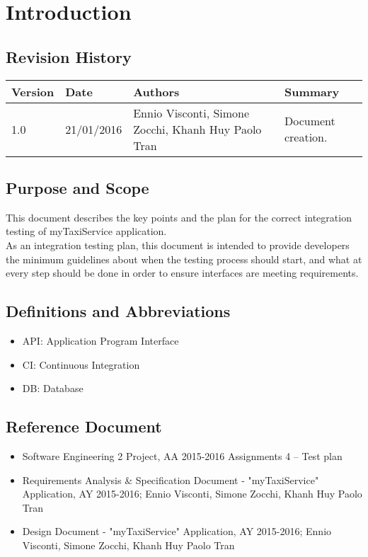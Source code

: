\section{Introduction}

\subsection{Revision History}
{\renewcommand{\arraystretch}{1.5}
\begin{tabularx}{\textwidth}{|l|l|X|l|}
    \hline 
    \textbf{Version} & \textbf{Date} & \textbf{Authors} & \textbf{Summary}\\ 
    \hline 
    
    1.0 & 21/01/2016 & Ennio Visconti, Simone Zocchi, Khanh Huy Paolo Tran & Document creation.\\
    \hline 
\end{tabularx}}

\subsection{Purpose and Scope}
This document describes the key points and the plan for the correct integration testing of myTaxiService application. \\
As an integration testing plan, this document is intended to provide developers the minimum guidelines about when the testing process should start, and what at every step should be done in order to ensure interfaces are meeting requirements.

\subsection{Definitions and Abbreviations}
\begin{itemize}
    \item API: Application Program Interface
    \item CI: Continuous Integration
    \item DB: Database
\end{itemize}

\subsection{Reference Document}
\begin{itemize}
    \item Software Engineering 2 Project, AA 2015-2016 Assignments 4 – Test plan 
    \item Requirements Analysis \& Specification Document - "myTaxiService" Application, AY 2015-2016; Ennio Visconti, Simone Zocchi, Khanh Huy Paolo Tran
    \item Design Document - "myTaxiService" Application, AY 2015-2016; Ennio Visconti, Simone Zocchi, Khanh Huy Paolo Tran
\end{itemize}